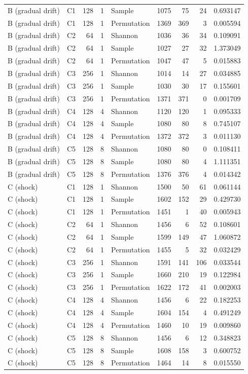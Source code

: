 \begin{longtable}{llrrlrrrl}
B (gradual drift) & C1 & 128 & 1 & Sample & 1075 & 75 & 24 & 0.693147 \\
B (gradual drift) & C1 & 128 & 1 & Permutation & 1369 & 369 & 3 & 0.005594 \\
B (gradual drift) & C2 & 64 & 1 & Shannon & 1036 & 36 & 34 & 0.109091 \\
B (gradual drift) & C2 & 64 & 1 & Sample & 1027 & 27 & 32 & 1.373049 \\
B (gradual drift) & C2 & 64 & 1 & Permutation & 1047 & 47 & 5 & 0.015883 \\
B (gradual drift) & C3 & 256 & 1 & Shannon & 1014 & 14 & 27 & 0.034885 \\
B (gradual drift) & C3 & 256 & 1 & Sample & 1030 & 30 & 17 & 0.155601 \\
B (gradual drift) & C3 & 256 & 1 & Permutation & 1371 & 371 & 0 & 0.001709 \\
B (gradual drift) & C4 & 128 & 4 & Shannon & 1120 & 120 & 1 & 0.095333 \\
B (gradual drift) & C4 & 128 & 4 & Sample & 1080 & 80 & 8 & 0.745107 \\
B (gradual drift) & C4 & 128 & 4 & Permutation & 1372 & 372 & 3 & 0.011130 \\
B (gradual drift) & C5 & 128 & 8 & Shannon & 1080 & 80 & 0 & 0.108411 \\
B (gradual drift) & C5 & 128 & 8 & Sample & 1080 & 80 & 4 & 1.111351 \\
B (gradual drift) & C5 & 128 & 8 & Permutation & 1376 & 376 & 4 & 0.014342 \\
C (shock) & C1 & 128 & 1 & Shannon & 1500 & 50 & 61 & 0.061144 \\
C (shock) & C1 & 128 & 1 & Sample & 1602 & 152 & 29 & 0.429730 \\
C (shock) & C1 & 128 & 1 & Permutation & 1451 & 1 & 40 & 0.005943 \\
C (shock) & C2 & 64 & 1 & Shannon & 1456 & 6 & 52 & 0.108601 \\
C (shock) & C2 & 64 & 1 & Sample & 1599 & 149 & 47 & 1.060872 \\
C (shock) & C2 & 64 & 1 & Permutation & 1455 & 5 & 32 & 0.032429 \\
C (shock) & C3 & 256 & 1 & Shannon & 1591 & 141 & 106 & 0.033544 \\
C (shock) & C3 & 256 & 1 & Sample & 1660 & 210 & 19 & 0.122984 \\
C (shock) & C3 & 256 & 1 & Permutation & 1622 & 172 & 41 & 0.002003 \\
C (shock) & C4 & 128 & 4 & Shannon & 1456 & 6 & 22 & 0.182253 \\
C (shock) & C4 & 128 & 4 & Sample & 1604 & 154 & 4 & 0.491249 \\
C (shock) & C4 & 128 & 4 & Permutation & 1460 & 10 & 19 & 0.009860 \\
C (shock) & C5 & 128 & 8 & Shannon & 1456 & 6 & 12 & 0.348823 \\
C (shock) & C5 & 128 & 8 & Sample & 1608 & 158 & 3 & 0.600752 \\
C (shock) & C5 & 128 & 8 & Permutation & 1464 & 14 & 8 & 0.015550 \\
\end{longtable}
